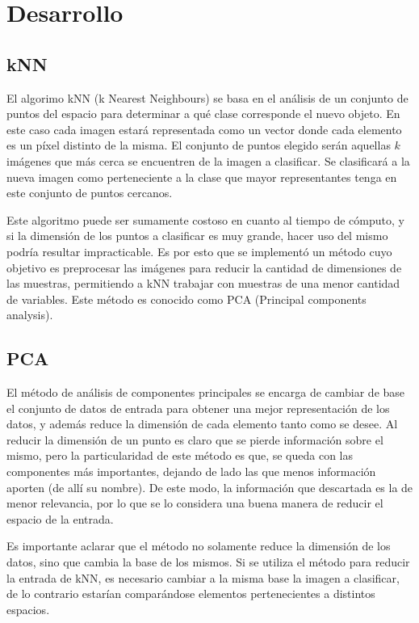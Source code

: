 \section{Desarrollo}

\subsection{kNN}

El algorimo kNN (k Nearest Neighbours) se basa en el análisis de un conjunto de puntos del espacio para determinar a qué clase corresponde el nuevo objeto. En este caso cada imagen estará representada como un vector donde cada elemento es un píxel distinto de la misma. El conjunto de puntos elegido serán aquellas $k$ imágenes que más cerca se encuentren de la imagen a clasificar. Se clasificará a la nueva imagen como perteneciente a la clase que mayor representantes tenga en este conjunto de puntos cercanos.

Este algoritmo puede ser sumamente costoso en cuanto al tiempo de cómputo, y si la dimensión de los puntos a clasificar es muy grande, hacer uso del mismo podría resultar impracticable. Es por esto que se implementó un método cuyo objetivo es preprocesar las imágenes para reducir la cantidad de dimensiones de las muestras, permitiendo a kNN trabajar con muestras de una menor cantidad de variables. Este método es conocido como PCA (Principal components analysis).

\subsection{PCA}

El método de análisis de componentes principales se encarga de cambiar de base el conjunto de datos de entrada para obtener una mejor representación de los datos, y además reduce la dimensión de cada elemento tanto como se desee. Al reducir la dimensión de un punto es claro que se pierde información sobre el mismo, pero la particularidad de este método es que, se queda con las componentes más importantes, dejando de lado las que menos información aporten (de allí su nombre). De este modo, la información que descartada es la de menor relevancia, por lo que se lo considera una buena manera de reducir el espacio de la entrada.

Es importante aclarar que el método no solamente reduce la dimensión de los datos, sino que cambia la base de los mismos. Si se utiliza el método para reducir la entrada de kNN, es necesario cambiar a la misma base la imagen a clasificar, de lo contrario estarían comparándose elementos pertenecientes a distintos espacios.

